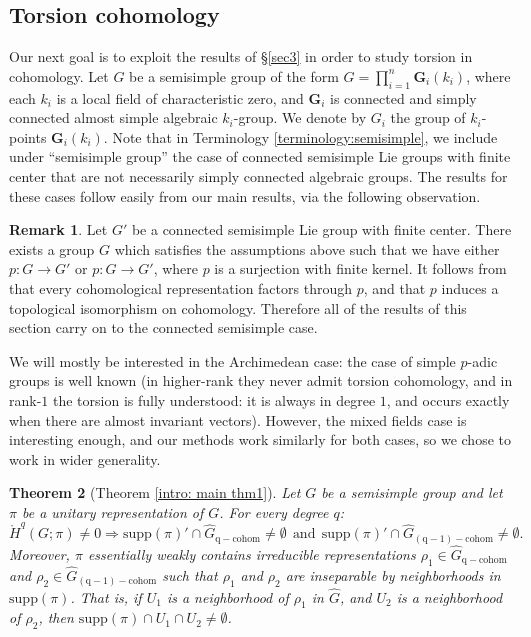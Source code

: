 \documentclass[12pt,reqno]{amsart}
\newtheorem{theorem}{Theorem}[section]
\theoremstyle{definition}
\newtheorem{remark}[theorem]{Remark}
\newcommand{\torH}{\mathring{H}}
\begin{document}
\subsection{Torsion cohomology}\label{subsec:5.2}
Our next goal is to exploit the results of \S\ref{sec3} in order to study torsion in cohomology. Let $G$ be a semisimple group of the form $G= \prod_{i=1}^n \mathbf{G}_i(k_i)$, where each $k_i$ is a local field of characteristic zero, and $\mathbf{G}_i$ is connected and simply connected almost simple algebraic $k_i$-group. We denote by $G_i$ the group of $k_i$-points $\mathbf{G}_i(k_i)$. Note that in Terminology \ref{terminology:semisimple}, we include under ``semisimple group'' the case of connected semisimple Lie groups with finite center that are not necessarily simply connected algebraic groups. The results for these cases follow easily from our main results, via the following observation.
\begin{remark}\label{rem:connected semisimple}
    Let $G'$ be a connected semisimple Lie group with finite center. There exists a group $G$ which satisfies the assumptions above such that we have either $p:G \rightarrow G'$ or $p:G \rightarrow G'$, where $p$ is a surjection with finite kernel. It follows from \cite[Lemma~3.4]{BaderSauer} that every cohomological representation factors through $p$, and that $p$ induces a topological isomorphism on cohomology. Therefore all of the results of this section carry on to the connected semisimple case.
\end{remark}
We will mostly be interested in the Archimedean case: the case of simple $p$-adic groups is well known (in higher-rank they never admit torsion cohomology, and in rank-$1$ the torsion is fully understood: it is always in degree $1$, and occurs exactly when there are almost invariant vectors). However, the mixed fields case is interesting enough, and our methods work similarly for both cases, so we chose to work in wider generality. 
\begin{theorem}[Theorem \ref{intro: main thm1}]\label{main1}
    Let $G$ be a semisimple group and let $\pi$ be a unitary representation of $G$.
    For every degree $q$: 
     \[ \torH^q(G;\pi)\neq 0  \Longrightarrow \mathrm{supp}(\pi)' \cap \widehat{G}_{\mathrm{q-cohom}} \neq \emptyset ~~\text{and}~~\mathrm{supp}(\pi)' \cap \widehat{G}_{\mathrm{(q-1)-cohom}} \neq \emptyset.\]
    Moreover, $\pi$ essentially weakly contains irreducible representations $\rho_1\in \widehat{G}_{\mathrm{q-cohom}}$ and $\rho_2\in \widehat{G}_{\mathrm{(q-1)-cohom}}$ such that $\rho_1$ and $\rho_2$ are inseparable by neighborhoods in $\mathrm{supp}(\pi)$. That is, if $U_1$ is a neighborhood of $\rho_1$ in $\widehat{G}$, and $U_2$ is a neighborhood of $\rho_2$, then $\mathrm{supp}(\pi) \cap U_1 \cap  U_2 \ne \emptyset$.
\end{theorem}
\end{document}
